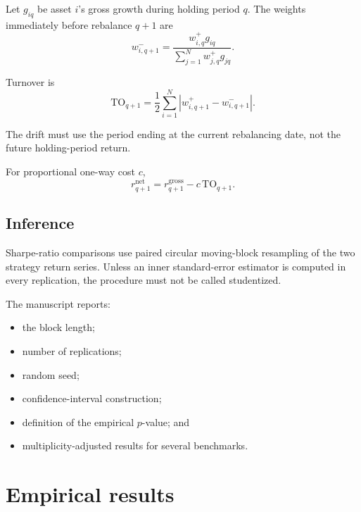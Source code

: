 \documentclass[11pt,a4paper]{article}
\theoremstyle{definition}
\theoremstyle{remark}
\begin{document}
Let \(g_{iq}\) be asset \(i\)'s gross growth during holding period \(q\). The
weights immediately before rebalance \(q+1\) are
\begin{equation}
w^-_{i,q+1}
=
\frac{w^+_{i,q}g_{iq}}
{\sum_{j=1}^{N}w^+_{j,q}g_{jq}}.
\label{eq:drifted-weights}
\end{equation}

Turnover is
\begin{equation}
\mathrm{TO}_{q+1}
=
\frac12
\sum_{i=1}^{N}
|w^+_{i,q+1}-w^-_{i,q+1}|.
\label{eq:turnover}
\end{equation}

The drift must use the period ending at the current rebalancing date, not the
future holding-period return.

For proportional one-way cost \(c\),
\begin{equation}
r^{\mathrm{net}}_{q+1}
=
r^{\mathrm{gross}}_{q+1}
-
c\,\mathrm{TO}_{q+1}.
\label{eq:net-return}
\end{equation}

\subsection{Inference}

Sharpe-ratio comparisons use paired circular moving-block resampling of the
two strategy return series. Unless an inner standard-error estimator is
computed in every replication, the procedure must not be called studentized.

The manuscript reports:

\begin{itemize}
    \item the block length;
    \item number of replications;
    \item random seed;
    \item confidence-interval construction;
    \item definition of the empirical \(p\)-value; and
    \item multiplicity-adjusted results for several benchmarks.
\end{itemize}

\section{Empirical results}
\end{document}

